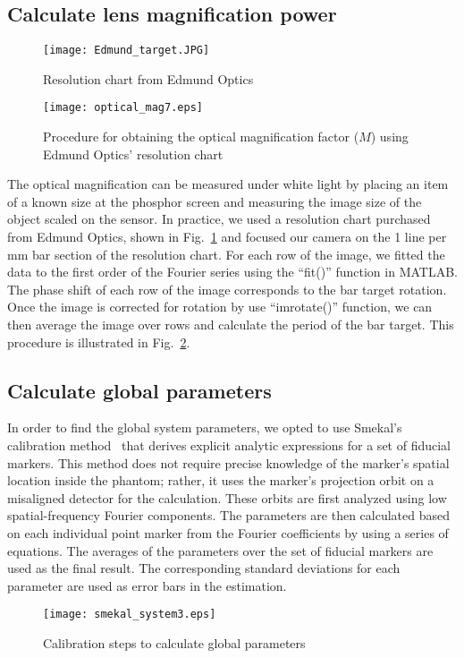 \subsection{Calculate lens magnification power}
\begin{figure}[ht]
\centering
\texttt{[image: Edmund\_target.JPG]}
\caption{Resolution chart from Edmund Optics}
\label{fig:edmund_target}
\end{figure}

\begin{figure}[ht]
\centering
\texttt{[image: optical\_mag7.eps]}
\caption{Procedure for obtaining the optical magnification factor ($M$) using Edmund Optics' resolution chart}
\label{fig:optical_mag}
\end{figure}
The optical magnification can be measured under white light by placing an item of a known size at the phosphor screen and measuring the image size of the object scaled on the sensor.  In practice, we used a resolution chart purchased from Edmund Optics, shown in Fig.~\ref{fig:edmund_target} and focused our camera on the 1 line per mm bar section of the resolution chart.  For each row of the image, we fitted the data to the first order of the Fourier series using the ``fit()'' function in MATLAB.  The phase shift of each row of the image corresponds to the bar target rotation.  Once the image is corrected for rotation by use ``imrotate()'' function, we can then average the image over rows and calculate the period of the bar target.  This procedure is illustrated in Fig.~\ref{fig:optical_mag}.

\subsection{Calculate global parameters}

In order to find the global system parameters, we opted to use Smekal's calibration method~\citep{Smekal2004} that derives explicit analytic expressions for a set of fiducial markers.  This method does not require precise knowledge of the marker's spatial location inside the phantom; rather, it uses the marker's projection orbit on a misaligned detector for the calculation.  These orbits are first analyzed using low spatial-frequency Fourier components.  The parameters are then calculated based on each individual point marker from the Fourier coefficients by using a series of equations.  The averages of the parameters over the set of fiducial markers are used as the final result.  The corresponding standard deviations for each parameter are used as error bars in the estimation.
%
\begin{figure}[ht]
\texttt{[image: smekal\_system3.eps]}
\caption{Calibration steps to calculate global parameters}
\label{fig:smekal_method}
\end{figure}


